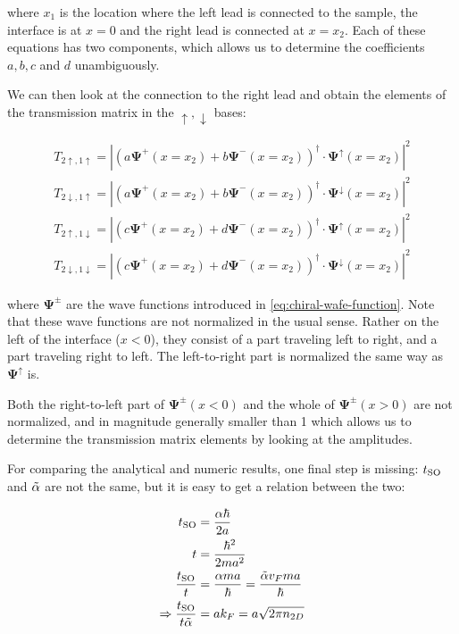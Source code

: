 where $x_1$ is the location where the left lead is connected to the sample, the
interface is at $x = 0$ and the right lead is connected at $x = x_2$.
Each of these equations has two components, which allows us to determine
the coefficients $a, b, c$ and $d$ unambiguously.


We can then look at the connection to the right lead and obtain the 
elements of the transmission matrix in the $\uparrow, \downarrow$ bases:

\begin{align}
    T_{2\uparrow,1\uparrow} = \left| \left( 
        a \mathbf{\Psi^+}(x=x_2) + b  \mathbf{\Psi^-}(x=x_2)
    \right)^\dagger \cdot \mathbf{\Psi}^\uparrow(x=x_2) \right|^2\nonumber\\
    T_{2\downarrow,1\uparrow} = \left| \left( 
        a \mathbf{\Psi^+}(x=x_2) + b  \mathbf{\Psi^-}(x=x_2)
    \right)^\dagger \cdot \mathbf{\Psi}^\downarrow(x=x_2) \right|^2\nonumber\\
    T_{2\uparrow,1\downarrow} = \left| \left( 
        c \mathbf{\Psi^+}(x=x_2) + d  \mathbf{\Psi^-}(x=x_2)
    \right)^\dagger \cdot \mathbf{\Psi}^\uparrow(x=x_2) \right|^2\nonumber\\
    T_{2\downarrow,1\downarrow} = \left| \left( 
        c \mathbf{\Psi^+}(x=x_2) + d  \mathbf{\Psi^-}(x=x_2)
    \right)^\dagger \cdot \mathbf{\Psi}^\downarrow(x=x_2) \right|^2
\end{align}

where $\mathbf{\Psi^\pm}$ are the wave functions introduced in
\ref{eq:chiral-wafe-function}. Note that these wave functions are not
normalized in the usual sense. Rather on the left of the interface ($x < 0$),
they consist of a part traveling left to right, and a part traveling right to
left. The left-to-right part is normalized the same way as
$\mathbf{\Psi^\uparrow}$
is.

Both the right-to-left part of $\mathbf{\Psi^\pm}(x < 0)$ and the whole of
$\mathbf{\Psi^\pm}(x > 0)$ are not normalized, and in magnitude generally
smaller than 1 which allows us to determine the transmission matrix elements
by looking at the amplitudes.

For comparing the analytical and numeric results, one final step is missing:
$t_{\textnormal{SO}}$ and $\tilde \alpha$ are not the same, but it is easy to get a relation between the
two:

\begin{align}
    t_{\textnormal{SO}} &= \frac{\alpha\hbar}{2a}\\
    t    &= \frac{\hbar^2}{2 m a^2}\\
    \frac{t_{\textnormal{SO}}}{t} &= \frac{\alpha m a}{\hbar} = \frac{\tilde \alpha v_F m a}{\hbar} \\
    \Rightarrow \frac{t_{\textnormal{SO}}}{t \tilde \alpha} &= a k_F = a \sqrt{2 \pi n_{2D}}
\end{align}

